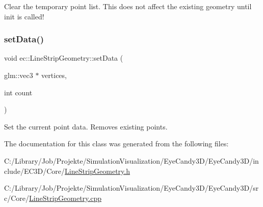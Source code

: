 Clear the temporary point list. This does not affect the existing geometry until init is called! \mbox{\label{classec_1_1_line_strip_geometry_a2649268027055ff190efb0efdc5768a4}} 
\subsubsection{\texorpdfstring{set\+Data()}{setData()}}
{\footnotesize\ttfamily void ec\+::\+Line\+Strip\+Geometry\+::set\+Data (\begin{DoxyParamCaption}\item[{glm\+::vec3 $\ast$}]{vertices,  }\item[{int}]{count }\end{DoxyParamCaption})}

Set the current point data. Removes existing points. 

The documentation for this class was generated from the following files\+:\begin{DoxyCompactItemize}
\item 
C\+:/\+Library/\+Job/\+Projekte/\+Simulation\+Visualization/\+Eye\+Candy3\+D/\+Eye\+Candy3\+D/include/\+E\+C3\+D/\+Core/\mbox{\hyperlink{_line_strip_geometry_8h}{Line\+Strip\+Geometry.\+h}}\item 
C\+:/\+Library/\+Job/\+Projekte/\+Simulation\+Visualization/\+Eye\+Candy3\+D/\+Eye\+Candy3\+D/src/\+Core/\mbox{\hyperlink{_line_strip_geometry_8cpp}{Line\+Strip\+Geometry.\+cpp}}\end{DoxyCompactItemize}

